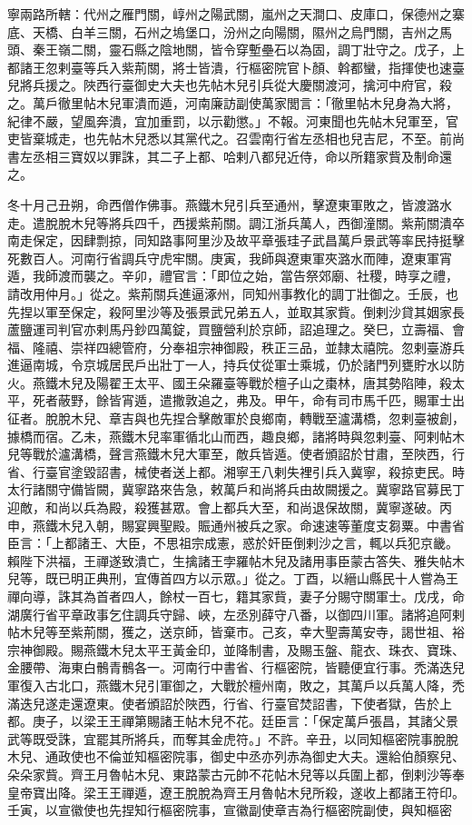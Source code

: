 \begin{pinyinscope}
寧兩路所轄：代州之雁門關，崞州之陽武關，嵐州之天澗口、皮庫口，保德州之寨底、天橋、白羊三關，石州之塢堡口，汾州之向陽關，隰州之烏門關，吉州之馬頭、秦王嶺二關，靈石縣之陰地關，皆令穿塹壘石以為固，調丁壯守之。戊子，上都諸王忽剌臺等兵入紫荊關，將士皆潰，行樞密院官卜顏、斡都蠻，指揮使也速臺兒將兵援之。陜西行臺御史大夫也先帖木兒引兵從大慶關渡河，擒河中府官，殺之。萬戶徹里帖木兒軍潰而遁，河南廉訪副使萬家閭言：「徹里帖木兒身為大將，紀律不嚴，望風奔潰，宜加重罰，以示勸懲。」不報。河東聞也先帖木兒軍至，官吏皆棄城走，也先帖木兒悉以其黨代之。召雲南行省左丞相也兒吉尼，不至。前尚書左丞相三寶奴以罪誅，其二子上都、哈剌八都兒近侍，命以所籍家貲及制命還之。



 冬十月己丑朔，命西僧作佛事。燕鐵木兒引兵至通州，擊遼東軍敗之，皆渡潞水走。遣脫脫木兒等將兵四千，西援紫荊關。調江浙兵萬人，西御潼關。紫荊關潰卒南走保定，因肆剽掠，同知路事阿里沙及故平章張珪子武昌萬戶景武等率民持挺擊死數百人。河南行省調兵守虎牢關。庚寅，我師與遼東軍夾潞水而陣，遼東軍宵遁，我師渡而襲之。辛卯，禮官言：「即位之始，當告祭郊廟、社稷，時享之禮，請改用仲月。」從之。紫荊關兵進逼涿州，同知州事教化的調丁壯御之。壬辰，也先捏以軍至保定，殺阿里沙等及張景武兄弟五人，並取其家貲。倒剌沙貸其姻家長蘆鹽運司判官亦剌馬丹鈔四萬錠，買鹽營利於京師，詔追理之。癸巳，立壽福、會福、隆禧、崇祥四總管府，分奉祖宗神御殿，秩正三品，並隸太禧院。忽剌臺游兵進逼南城，令京城居民戶出壯丁一人，持兵仗從軍士乘城，仍於諸門列甕貯水以防火。燕鐵木兒及陽翟王太平、國王朵羅臺等戰於檀子山之棗林，唐其勢陷陣，殺太平，死者蔽野，餘皆宵遁，遣撒敦追之，弗及。甲午，命有司市馬千匹，賜軍士出征者。脫脫木兒、章吉與也先捏合擊敵軍於良鄉南，轉戰至瀘溝橋，忽剌臺被創，據橋而宿。乙未，燕鐵木兒率軍循北山而西，趣良鄉，諸將時與忽剌臺、阿剌帖木兒等戰於瀘溝橋，聲言燕鐵木兒大軍至，敵兵皆遁。使者頒詔於甘肅，至陜西，行省、行臺官塗毀詔書，械使者送上都。湘寧王八剌失裡引兵入冀寧，殺掠吏民。時太行諸關守備皆闕，冀寧路來告急，敕萬戶和尚將兵由故闕援之。冀寧路官募民丁迎敵，和尚以兵為殿，殺獲甚眾。會上都兵大至，和尚退保故關，冀寧遂破。丙申，燕鐵木兒入朝，賜宴興聖殿。賑通州被兵之家。命速速等董度支芻粟。中書省臣言：「上都諸王、大臣，不思祖宗成憲，惑於奸臣倒剌沙之言，輒以兵犯京畿。賴陛下洪福，王禪遂致潰亡，生擒諸王孛羅帖木兒及諸用事臣蒙古答失、雅失帖木兒等，既已明正典刑，宜傳首四方以示眾。」從之。丁酉，以縉山縣民十人嘗為王禪向導，誅其為首者四人，餘杖一百七，籍其家貲，妻子分賜守關軍士。戊戌，命湖廣行省平章政事乞住調兵守歸、峽，左丞別薛守八番，以御四川軍。諸將追阿剌帖木兒等至紫荊關，獲之，送京師，皆棄市。己亥，幸大聖壽萬安寺，謁世祖、裕宗神御殿。賜燕鐵木兒太平王黃金印，並降制書，及賜玉盤、龍衣、珠衣、寶珠、金腰帶、海東白鶻青鶻各一。河南行中書省、行樞密院，皆聽便宜行事。禿滿迭兒軍復入古北口，燕鐵木兒引軍御之，大戰於檀州南，敗之，其萬戶以兵萬人降，禿滿迭兒遂走還遼東。使者頒詔於陜西，行省、行臺官焚詔書，下使者獄，告於上都。庚子，以梁王王禪第賜諸王帖木兒不花。廷臣言：「保定萬戶張昌，其諸父景武等既受誅，宜罷其所將兵，而奪其金虎符。」不許。辛丑，以同知樞密院事脫脫木兒、通政使也不倫並知樞密院事，御史中丞亦列赤為御史大夫。還給伯顏察兒、朵朵家貲。齊王月魯帖木兒、東路蒙古元帥不花帖木兒等以兵圍上都，倒剌沙等奉皇帝寶出降。梁王王禪遁，遼王脫脫為齊王月魯帖木兒所殺，遂收上都諸王符印。壬寅，以宣徽使也先捏知行樞密院事，宣徽副使章吉為行樞密院副使，與知樞密
\end{pinyinscope}
